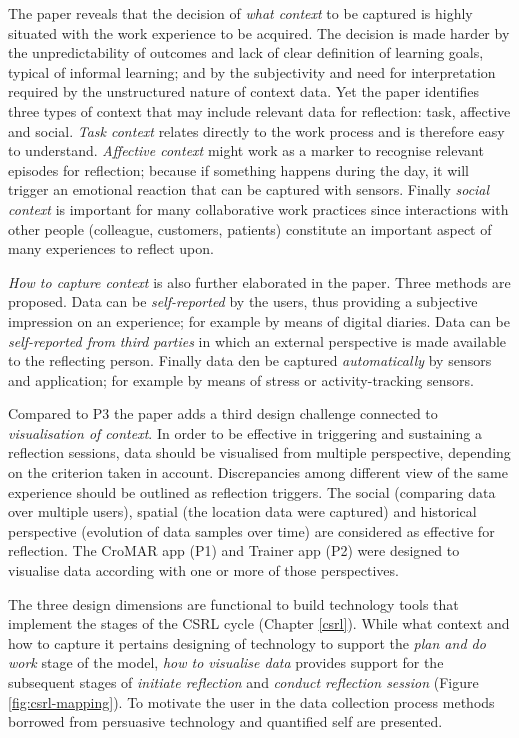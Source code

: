 The paper reveals that the decision of \emph{what context} to be
captured is highly situated with the work experience to be acquired. The
decision is made harder by the unpredictability of outcomes and lack of
clear definition of learning goals, typical of informal learning; and by
the subjectivity and need for interpretation required by the
unstructured nature of context data. Yet the paper identifies three
types of context that may include relevant data for reflection: task,
affective and social. \emph{Task context} relates directly to the work
process and is therefore easy to understand. \emph{Affective context}
might work as a marker to recognise relevant episodes for reflection;
because if something happens during the day, it will trigger an
emotional reaction that can be captured with sensors. Finally
\emph{social context} is important for many collaborative work practices
since interactions with other people (colleague, customers, patients)
constitute an important aspect of many experiences to reflect upon.

\emph{How to capture context} is also further elaborated in the paper.
Three methods are proposed. Data can be \emph{self-reported} by the
users, thus providing a subjective impression on an experience; for
example by means of digital diaries. Data can be \emph{self-reported
from third parties} in which an external perspective is made available
to the reflecting person. Finally data den be captured
\emph{automatically} by sensors and application; for example by means of
stress or activity-tracking sensors.

Compared to P3 the paper adds a third design challenge connected to
\emph{visualisation of context}. In order to be effective in triggering
and sustaining a reflection sessions, data should be visualised from
multiple perspective, depending on the criterion taken in account.
Discrepancies among different view of the same experience should be
outlined as reflection triggers. The social (comparing data over
multiple users), spatial (the location data were captured) and
historical perspective (evolution of data samples over time) are
considered as effective for reflection. The CroMAR app (P1) and Trainer
app (P2) were designed to visualise data according with one or more of
those perspectives.

The three design dimensions are functional to build technology tools
that implement the stages of the CSRL cycle (Chapter \ref{csrl}). While
what context and how to capture it pertains designing of technology to
support the \emph{plan and do work} stage of the model, \emph{how to
visualise data} provides support for the subsequent stages of
\emph{initiate reflection} and \emph{conduct reflection session} (Figure
\ref{fig:csrl-mapping}). To motivate the user in the data collection
process methods borrowed from persuasive technology and quantified self
are presented.

